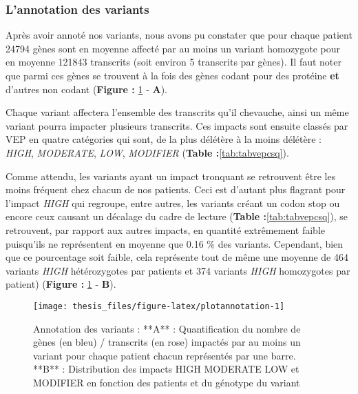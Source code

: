 \documentclass[12pt,twoside]{reedthesis}
\theoremstyle{definition}
\theoremstyle{definition}
\theoremstyle{remark}
\begin{document}
  \newpage
  
  \subsubsection{L'annotation des
  variants}\label{lannotation-des-variants}
  
  Après avoir annoté nos variants, nous avons pu constater que pour chaque
  patient 24794 gènes sont en moyenne affecté par au moins un variant
  homozygote pour en moyenne 121843 transcrits (soit environ 5 transcrits
  par gènes). Il faut noter que parmi ces gènes se trouvent à la fois des
  gènes codant pour des protéine \textbf{et} d'autres non codant
  (\textbf{Figure : }\ref{fig:plotannotation} - \textbf{A}).
  
  Chaque variant affectera l'ensemble des transcrits qu'il chevauche,
  ainsi un même variant pourra impacter plusieurs transcrits. Ces impacts
  sont ensuite classés par VEP en quatre catégories qui sont, de la plus
  délétère à la moins délétère : \emph{HIGH}, \emph{MODERATE}, \emph{LOW},
  \emph{MODIFIER} (\textbf{Table :}\ref{tab:tabvepcsq}).
  
  Comme attendu, les variants ayant un impact tronquant se retrouvent être
  les moins fréquent chez chacun de nos patients. Ceci est d'autant plus
  flagrant pour l'impact \emph{HIGH} qui regroupe, entre autres, les
  variants créant un codon stop ou encore ceux causant un décalage du
  cadre de lecture (\textbf{Table :}\ref{tab:tabvepcsq}), se retrouvent,
  par rapport aux autres impacts, en quantité extrêmement faible
  puisqu'ils ne représentent en moyenne que 0.16 \% des variants.
  Cependant, bien que ce pourcentage soit faible, cela représente tout de
  même une moyenne de 464 variants \emph{HIGH} hétérozygotes par patients
  et 374 variants \emph{HIGH} homozygotes par patient) (\textbf{Figure :
  }\ref{fig:plotannotation} - \textbf{B}).
  
  \newpage
  
  \begin{figure}
  
  {\centering \texttt{[image: thesis\_files/figure-latex/plotannotation-1]} 
  
  }
  
  \caption[Annotation des variants]{Annotation des variants : **A** : Quantification du nombre de gènes (en bleu) / transcrits (en rose) impactés par au moins un variant pour chaque patient chacun représentés par une barre. **B** : Distribution des impacts HIGH MODERATE LOW et MODIFIER en fonction des patients et du génotype du variant}\label{fig:plotannotation}
  \end{figure}
  
\end{document}
